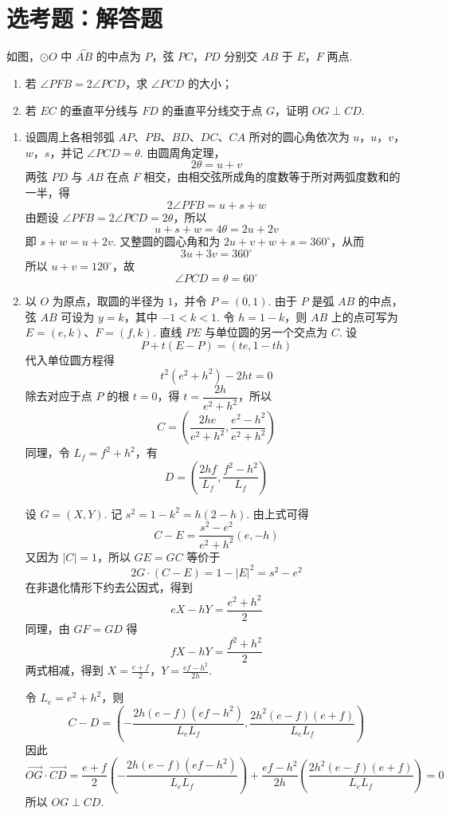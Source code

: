 \section{选考题：解答题}

\begin{problem}
如图，\(\odot O\) 中 \(\overset{\frown}{AB}\) 的中点为 \(P\)，弦 \(PC\)，\(PD\) 分别交 \(AB\) 于 \(E\)，\(F\) 两点.

\begin{enumerate}
\item 若 \(\angle PFB=2\angle PCD\)，求 \(\angle PCD\) 的大小；
\item 若 \(EC\) 的垂直平分线与 \(FD\) 的垂直平分线交于点 \(G\)，证明 \(OG\perp CD\).
\end{enumerate}

\begingroup
{}
\endgroup
\end{problem}

\begin{solution}
\begin{enumerate}
\item 设圆周上各相邻弧 \(AP\)、\(PB\)、\(BD\)、\(DC\)、\(CA\) 所对的圆心角依次为 \(u\)，\(u\)，\(v\)，\(w\)，\(s\)，并记 \(\angle PCD=\theta\). 由圆周角定理，
\[
2\theta=u+v
\]
两弦 \(PD\) 与 \(AB\) 在点 \(F\) 相交，由相交弦所成角的度数等于所对两弧度数和的一半，得
\[
2\angle PFB=u+s+w
\]
由题设 \(\angle PFB=2\angle PCD=2\theta\)，所以
\[
u+s+w=4\theta=2u+2v
\]
即 \(s+w=u+2v\). 又整圆的圆心角和为 \(2u+v+w+s=360^\circ\)，从而
\[
3u+3v=360^\circ
\]
所以 \(u+v=120^\circ\)，故
\[
\angle PCD=\theta=60^\circ
\]

\item 以 \(O\) 为原点，取圆的半径为 \(1\)，并令 \(P=(0,1)\). 由于 \(P\) 是弧 \(AB\) 的中点，弦 \(AB\) 可设为 \(y=k\)，其中 \(-1<k<1\). 令 \(h=1-k\)，则 \(AB\) 上的点可写为 \(E=(e,k)\)、\(F=(f,k)\). 直线 \(PE\) 与单位圆的另一个交点为 \(C\). 设
\[
P+t(E-P)=(te,1-th)
\]
代入单位圆方程得
\[
t^2(e^2+h^2)-2ht=0
\]
除去对应于点 \(P\) 的根 \(t=0\)，得 \(t=\dfrac{2h}{e^2+h^2}\)，所以
\[
C=\left(\frac{2he}{e^2+h^2},\frac{e^2-h^2}{e^2+h^2}\right)
\]
同理，令 \(L_f=f^2+h^2\)，有
\[
D=\left(\frac{2hf}{L_f},\frac{f^2-h^2}{L_f}\right)
\]

设 \(G=(X,Y)\). 记 \(s^2=1-k^2=h(2-h)\). 由上式可得
\[
C-E=\frac{s^2-e^2}{e^2+h^2}(e,-h)
\]
又因为 \(|C|=1\)，所以 \(GE=GC\) 等价于
\[
2G\cdot(C-E)=1-|E|^2=s^2-e^2
\]
在非退化情形下约去公因式，得到
\[
eX-hY=\frac{e^2+h^2}{2}
\]
同理，由 \(GF=GD\) 得
\[
fX-hY=\frac{f^2+h^2}{2}
\]
两式相减，得到
\(X=\frac{e+f}{2}\)，\(Y=\frac{ef-h^2}{2h}\).

令 \(L_e=e^2+h^2\)，则
\[
C-D=\left(-\frac{2h(e-f)(ef-h^2)}{L_eL_f},\frac{2h^2(e-f)(e+f)}{L_eL_f}\right)
\]
因此
\[
\overrightarrow{OG}\cdot\overrightarrow{CD}
=\frac{e+f}{2}\left(-\frac{2h(e-f)(ef-h^2)}{L_eL_f}\right)+\frac{ef-h^2}{2h}\left(\frac{2h^2(e-f)(e+f)}{L_eL_f}\right)=0
\]
所以 \(OG\perp CD\).
\end{enumerate}
\end{solution}

